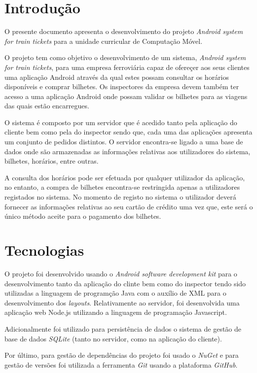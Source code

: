\documentclass[12pt]{article}
\begin{document}
\newpage

\section{Introdução}

O presente documento apresenta o desenvolvimento do projeto \textit{Android system for train tickets} para a unidade curricular de Computação Móvel.

O projeto tem como objetivo o desenvolvimento de um sistema, \textit{Android system for train tickets}, para uma empresa ferroviária capaz de ofereçer aos seus clientes uma aplicação Android através da qual estes possam consultar os horários disponíveis e comprar bilhetes. Os inspectores da empresa devem também ter acesso a uma aplicação Android onde possam validar os bilhetes para as viagens das quais estão encarregues.  

O sistema é composto por um servidor que é acedido tanto pela aplicação do cliente bem como pela do inspector sendo que, cada uma das aplicações apresenta um conjunto de pedidos distintos. O servidor encontra-se ligado a uma base de dados onde são armazenadas as informações relativas aos utilizadores do sistema, bilhetes, horários, entre outras.

A consulta dos horários pode ser efetuada por qualquer utilizador da aplicação, no entanto, a compra de bilhetes encontra-se restringida apenas a utilizadores registados no sistema. No momento de registo no sistema o utilizador deverá fornecer as informações relativas ao seu cartão de crédito uma vez que, este será o único método aceite para o pagamento dos bilhetes.


\section{Tecnologias}

O projeto foi desenvolvido usando o \textit{Android software development kit} para o desenvolvimento tanto da aplicação do clinte bem como do inspector tendo sido utilizadas a linguagem de programção Java com o auxílio de XML para o desenvolvimento dos \textit{layouts}. Relativamente ao servidor, foi desenvolvida uma aplicação web Node.js utilizando a linguagem de programação Javascript.

Adicionalmente foi utilizado para persistência de dados o sistema de gestão de base de dados \textit{SQLite} (tanto no servidor, como na aplicação do cliente).

Por último, para gestão de dependências do projeto foi usado o \textit{NuGet} e para gestão de versões foi utilizada a ferramenta \textit{Git} usando a plataforma \textit{GitHub}.
\end{document}
